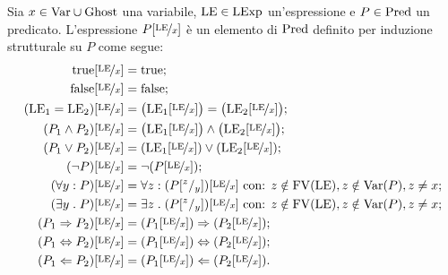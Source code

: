 \begin{definizione} 
Sia $x \in \mathrm{Var} \cup \mathrm{Ghost}$ una variabile, $\mathrm{LE} \in \mathrm{LExp}$ un'espressione
e $P \in \mathrm{Pred}$ un predicato.
L'espressione $P[\nicefrac{\mathrm{LE}}{x}]$ è un elemento di $\mathrm{Pred}$ definito
per induzione strutturale su $P$ come segue:
\begin{align*}
  \mathrm{true}[\nicefrac{\mathrm{LE}}{x}]
    &= \mathrm{true};\\
  \mathrm{false}[\nicefrac{\mathrm{LE}}{x}]
    &= \mathrm{false};\\
  (\mathrm{LE}_1 = \mathrm{LE}_2)[\nicefrac{\mathrm{LE}}{x}]
    &= \bigl(\mathrm{LE}_1[\nicefrac{\mathrm{LE}}{x}]\bigr) = \bigl(\mathrm{LE}_2[\nicefrac{\mathrm{LE}}{x}]\bigr); \\
  (P_1 \land P_2)[\nicefrac{\mathrm{LE}}{x}]
    &= \bigl(\mathrm{LE}_1[\nicefrac{\mathrm{LE}}{x}]\bigr) \land \bigl(\mathrm{LE}_2[\nicefrac{\mathrm{LE}}{x}]\bigr);\\
  (P_1 \lor P_2)[\nicefrac{\mathrm{LE}}{x}]
    &= (\mathrm{LE}_1[\nicefrac{\mathrm{LE}}{x}]) \lor (\mathrm{LE}_2[\nicefrac{\mathrm{LE}}{x}]);\\
  (\neg P)[\nicefrac{\mathrm{LE}}{x}]
    &= \neg(P[\nicefrac{\mathrm{LE}}{x}]);\\
  (\forall y\mathrel{:} P)[\nicefrac{\mathrm{LE}}{x}]
    &= \forall z\mathrel{:} (P[^z/_y])[\nicefrac{\mathrm{LE}}{x}] \text{ con: $z\notin\mathrm{FV}(\mathrm{LE}), z\notin\mathrm{Var}(P),z\neq x$};\\
  (\exists  y\mathrel{.} P)[\nicefrac{\mathrm{LE}}{x}]
    &= \exists z\mathrel{.} (P[^z/_y])[\nicefrac{\mathrm{LE}}{x}] \text{ con: $z\notin\mathrm{FV}(\mathrm{LE}),  z\notin\mathrm{Var}(P), z\neq x$};\\
  (P_1 \Rightarrow P_2)[\nicefrac{\mathrm{LE}}{x}]
    &= (P_1[\nicefrac{\mathrm{LE}}{x}]) \Rightarrow (P_2[\nicefrac{\mathrm{LE}}{x}]);\\
  (P_1 \Leftrightarrow P_2)[\nicefrac{\mathrm{LE}}{x}]
    &= (P_1[\nicefrac{\mathrm{LE}}{x}]) \Leftrightarrow (P_2[\nicefrac{\mathrm{LE}}{x}]); \\
  (P_1 \Leftarrow P_2)[\nicefrac{\mathrm{LE}}{x}]
    &= (P_1[\nicefrac{\mathrm{LE}}{x}]) \Leftarrow (P_2[\nicefrac{\mathrm{LE}}{x}]).
\end{align*}
\end{definizione}

